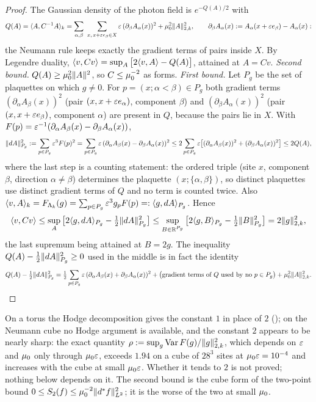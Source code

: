 \begin{proof}
The Gaussian density of the photon field is $e^{-Q(A)/2}$ with
\[
Q(A)=\langle A,C^{-1}A\rangle_k=\sum_{\alpha,\beta}\ \sum_{x,\,x+\varepsilon e_\beta\in X}\varepsilon\,(\partial_\beta A_\alpha(x))^2+\mu_0^2\lVert A\rVert_{2,k}^2,\qquad \partial_\beta A_\alpha(x):= A_\alpha(x+\varepsilon e_\beta)-A_\alpha(x):
\]
the Neumann rule keeps exactly the gradient terms of pairs inside $X$. By Legendre duality, $\langle v,Cv\rangle=\sup_A\big[2\langle v,A\rangle-Q(A)\big]$, attained at $A=Cv$. \emph{Second bound.} $Q(A)\ge\mu_0^2\lVert A\rVert^2$, so $C\le\mu_0^{-2}$ as forms. \emph{First bound.} Let $P_g$ be the set of plaquettes on which $g\ne0$. For $p=(x;\alpha<\beta)\in P_g$ both gradient terms $(\partial_\alpha A_\beta(x))^2$ (pair $(x,x+\varepsilon e_\alpha)$, component $\beta$) and $(\partial_\beta A_\alpha(x))^2$ (pair $(x,x+\varepsilon e_\beta)$, component $\alpha$) are present in $Q$, because the pairs lie in $X$. With $F(p)=\varepsilon^{-1}(\partial_\alpha A_\beta(x)-\partial_\beta A_\alpha(x))$,
\[
\lVert dA\rVert^2_{P_g}:=\sum_{p\in P_g}\varepsilon^3F(p)^2=\sum_{p\in P_g}\varepsilon\,(\partial_\alpha A_\beta(x)-\partial_\beta A_\alpha(x))^2\le2\sum_{p\in P_g}\varepsilon\big[(\partial_\alpha A_\beta(x))^2+(\partial_\beta A_\alpha(x))^2\big]\le2Q(A),
\]
where the last step is a counting statement: the ordered triple (site $x$, component $\beta$, direction $\alpha\ne\beta$) determines the plaquette $(x;\{\alpha,\beta\})$, so distinct plaquettes use distinct gradient terms of $Q$ and no term is counted twice. Also $\langle v,A\rangle_k=F_{\Lambda_k}(g)=\sum_{p\in P_g}\varepsilon^3g_pF(p)=:\langle g,dA\rangle_{P_g}$. Hence
\[
\langle v,Cv\rangle\le\sup_A\big[2\langle g,dA\rangle_{P_g}-\tfrac12\lVert dA\rVert^2_{P_g}\big]\le\sup_{B\in\mathbb R^{P_g}}\big[2\langle g,B\rangle_{P_g}-\tfrac12\lVert B\rVert^2_{P_g}\big]=2\lVert g\rVert_{2,k}^2,
\]
the last supremum being attained at $B=2g$. The inequality $Q(A)-\frac12\lVert dA\rVert^2_{P_g}\ge0$ used in the middle is in fact the identity
\[
Q(A)-\tfrac12\lVert dA\rVert^2_{P_g}=\tfrac12\sum_{p\in P_g}\varepsilon\,(\partial_\alpha A_\beta(x)+\partial_\beta A_\alpha(x))^2+\big(\text{gradient terms of $Q$ used by no $p\in P_g$}\big)+\mu_0^2\lVert A\rVert^2_{2,k}.\qedhere
\]
\end{proof}

\begin{remark}\label{rem:s05:sharp}
On a torus the Hodge decomposition gives the constant $1$ in place of $2$ (\cite[Lemma~7.3]{SymPhase}); on the Neumann cube no Hodge argument is available, and the constant $2$ appears to be nearly sharp: the exact quantity $\rho:=\sup_g\operatorname{Var} F(g)/\lVert g\rVert^2_{2,k}$, which depends on $\varepsilon$ and $\mu_0$ only through $\mu_0\varepsilon$, exceeds $1.94$ on a cube of $28^3$ sites at $\mu_0\varepsilon=10^{-4}$ and increases with the cube at small $\mu_0\varepsilon$. Whether it tends to $2$ is not proved; nothing below depends on it. The second bound is the cube form of the two-point bound $0\le S_2(f)\le\mu_0^{-2}\lVert d^{*} f\rVert^2_{L^2}$; it is the worse of the two at small $\mu_0$.
\end{remark}

